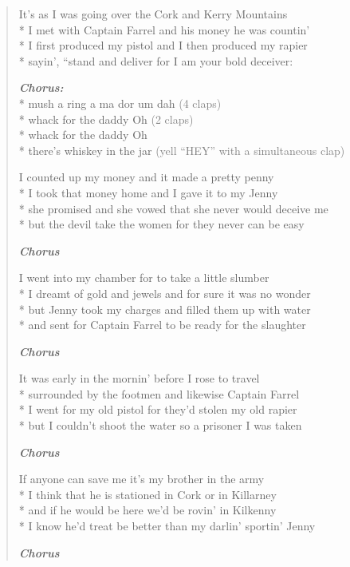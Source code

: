 \documentclass[9pt,twoside]{extarticle}
\newenvironment{xverse}{
	\begin{verse}
	\fontsize{8.5}{10.5}\selectfont
	}
	{
	\end{verse}
	\penalty 0
}
\newcommand{\chorusdef}{\textbf{\emph{Chorus:}}\\*}
\newcommand{\chorusmark}[1][1]{%
\vspace{-0.5\stanzaskip}%
\textbf{\emph{Chorus \ifthenelse{\equal{#1}{1}}{}{$\times$ #1}}}%
\vspace{-0.5\stanzaskip}%
}
\newcommand{\gray}[1]{\textcolor{gray}{#1}}
\begin{document}
\begin{xverse}
It’s as I was going over the Cork and Kerry Mountains \\*
I met with Captain Farrel and his money he was countin’ \\*
I first produced my pistol and I then produced my rapier \\*
sayin’, “stand and deliver for I am your bold deceiver:

\chorusdef
mush a ring a ma dor um dah \gray{(4 claps)} \\*
whack for the daddy Oh \gray{(2 claps)} \\*
whack for the daddy Oh \\*
there’s whiskey in the jar \gray{(yell “HEY” with a simultaneous clap)}

I counted up my money and it made a pretty penny \\*
I took that money home and I gave it to my Jenny \\*
she promised and she vowed that she never would deceive me \\*
but the devil take the women for they never can be easy

\chorusmark

I went into my chamber for to take a little slumber \\*
I dreamt of gold and jewels and for sure it was no wonder \\*
but Jenny took my charges and filled them up with water \\*
and sent for Captain Farrel to be ready for the slaughter

\chorusmark

It was early in the mornin’ before I rose to travel \\*
surrounded by the footmen and likewise Captain Farrel \\*
I went for my old pistol for they’d stolen my old rapier \\*
but I couldn’t shoot the water so a prisoner I was taken

\chorusmark

If anyone can save me it’s my brother in the army \\*
I think that he is stationed in Cork or in Killarney \\*
and if he would be here we’d be rovin’ in Kilkenny \\*
I know he’d treat be better than my darlin’ sportin’ Jenny

\chorusmark
\end{xverse}
\end{document}
